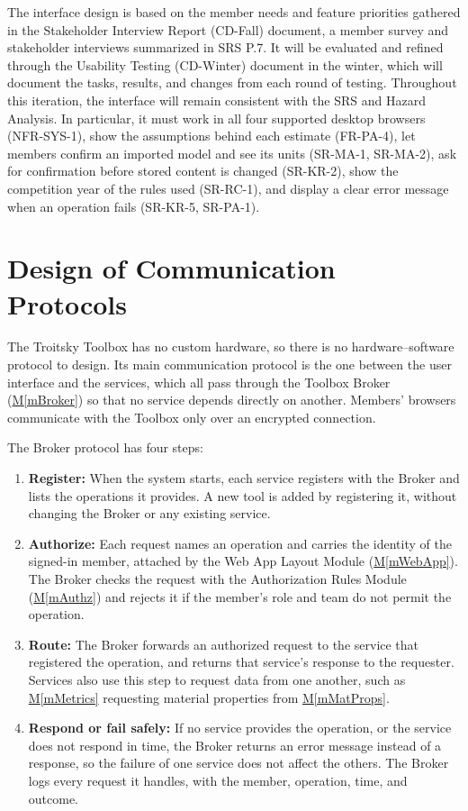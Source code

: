 \documentclass[12pt, titlepage]{article}
\newcommand{\mref}[1]{\hyperref[#1:dec]{M\ref*{#1}}}
\begin{document}
The interface design is based on the member needs and feature priorities gathered in the Stakeholder Interview Report (CD-Fall) document, a member survey and stakeholder interviews summarized in SRS P.7. It will be evaluated and refined through the Usability Testing (CD-Winter) document in the winter, which will document the tasks, results, and changes from each round of testing. Throughout this iteration, the interface will remain consistent with the SRS and Hazard Analysis. In particular, it must work in all four supported desktop browsers (NFR-SYS-1), show the assumptions behind each estimate (FR-PA-4), let members confirm an imported model and see its units (SR-MA-1, SR-MA-2), ask for confirmation before stored content is changed (SR-KR-2), show the competition year of the rules used (SR-RC-1), and display a clear error message when an operation fails (SR-KR-5, SR-PA-1).

\section{Design of Communication Protocols} \label{SecComm}

The Troitsky Toolbox has no custom hardware, so there is no hardware--software protocol to design. Its main communication protocol is the one between the user interface and the services, which all pass through the Toolbox Broker (\mref{mBroker}) so that no service depends directly on another. Members' browsers communicate with the Toolbox only over an encrypted connection.

The Broker protocol has four steps:
\begin{enumerate}
\item \textbf{Register:} When the system starts, each service registers with the Broker and lists the operations it provides. A new tool is added by registering it, without changing the Broker or any existing service.
\item \textbf{Authorize:} Each request names an operation and carries the identity of the signed-in member, attached by the Web App Layout Module (\mref{mWebApp}). The Broker checks the request with the Authorization Rules Module (\mref{mAuthz}) and rejects it if the member's role and team do not permit the operation.
\item \textbf{Route:} The Broker forwards an authorized request to the service that registered the operation, and returns that service's response to the requester. Services also use this step to request data from one another, such as \mref{mMetrics} requesting material properties from \mref{mMatProps}.
\item \textbf{Respond or fail safely:} If no service provides the operation, or the service does not respond in time, the Broker returns an error message instead of a response, so the failure of one service does not affect the others. The Broker logs every request it handles, with the member, operation, time, and outcome.
\end{enumerate}
\end{document}
